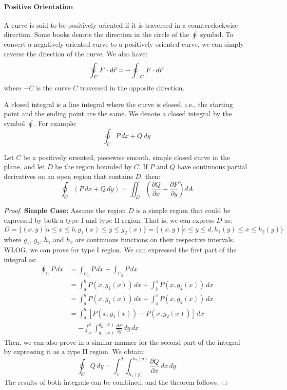 \documentclass[11pt]{report}
\begin{document}
\paragraph{Positive Orientation} A curve is said to be positively oriented if it is traversed in a counterclockwise direction. Some books denote the direction in the circle of the $\oint$ symbol. To convert a negatively oriented curve to a positively oriented curve, we can simply reverse the direction of the curve. We also have:
\begin{equation}
    \oint_C F \cdot d\vec{r} = -\oint_{-C} F \cdot d\vec{r} \\
\end{equation}
where $-C$ is the curve $C$ traversed in the opposite direction.
\begin{definition}
    A closed integral is a line integral where the curve is closed, i.e., the starting point and the ending point are the same. We denote a closed integral by the symbol \(\oint\). For example:
    \[
        \oint_C P \, dx + Q \, dy
    \]
\end{definition}

\begin{theorem}
    Let \(C\) be a positively oriented, piecewise smooth, simple closed curve in the plane, and let \(D\) be the region bounded by \(C\). If \(P\) and \(Q\) have continuous partial derivatives on an open region that contains \(D\), then:
    \[
    \oint_C (P \, dx + Q \, dy) = \iint_D \left( \frac{\partial Q}{\partial x} - \frac{\partial P}{\partial y} \right) dA
    \]
\end{theorem}

\begin{proof}
    \textbf{Simple Case:}
    Assume the region \(D\) is a simple region that could be expressed by both a type I and type II region. That is, we can express \(D\) as:
    \[
        D = \{(x,y) | a \leq x \leq b, g_1(x) \leq y \leq g_2(x) \} = \{(x,y) | c \leq y \leq d, h_1(y) \leq x \leq h_2(y) \}
    \]
    where \(g_1\), \(g_2\), \(h_1\) and \(h_2\) are continuous functions on their respective intervals. WLOG, we can prove for type I region. We can expressed the first part of the integral as:
    \begin{align*}
        \oint_C P \, dx &= \int_{C_1} P \, dx + \int_{C_2} P \, dx \\
        &= \int_a^b P(x, g_1(x)) \, dx + \int_b^a P(x, g_2(x)) \, dx \\
        &= \int_a^b P(x, g_1(x)) \, dx - \int_a^b P(x, g_2(x)) \, dx \\
        &= \int_a^b [P(x, g_1(x)) - P(x, g_2(x))] \, dx \\
        &= -\int_a^b \int_{g_1(x)}^{g_2(x)} \frac{\partial P}{\partial y} \, dy \, dx
    \end{align*}
    Then, we can also prove in a similar manner for the second part of the integral by expressing it as a type II region. We obtain:
    $$
        \oint_C Q \, dy = \int_c^d \int_{h_1(y)}^{h_2(y)} \frac{\partial Q}{\partial x} \, dx \, dy
    $$
    The results of both integrals can be combined, and the theorem follows.
\end{proof}
\end{document}

